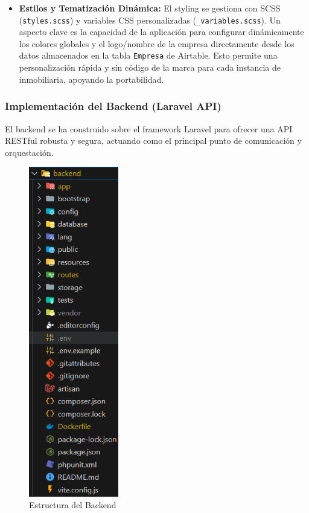 \begin{itemize}
    \item \textbf{Estilos y Tematización Dinámica:} El styling se gestiona con SCSS (\texttt{styles.scss}) y variables CSS personalizadas (\texttt{\_variables.scss}). Un aspecto clave es la capacidad de la aplicación para configurar dinámicamente los colores globales y el logo/nombre de la empresa directamente desde los datos almacenados en la tabla \texttt{Empresa} de Airtable. Esto permite una personalización rápida y sin código de la marca para cada instancia de inmobiliaria, apoyando la portabilidad.
\end{itemize}

\clearpage


\subsubsection{Implementación del Backend (Laravel API)}


El backend se ha construido sobre el framework Laravel para ofrecer una API RESTful robusta y segura, actuando como el principal punto de comunicación y orquestación.

\begin{figure}[H]
    \begin{center}
        \includegraphics[width = 0.35\textwidth]{Figuras/directoriosbackend.png}
    \end{center}
    \caption{\label{fig:directoriosbackend} Estructura del Backend}
\end{figure}

